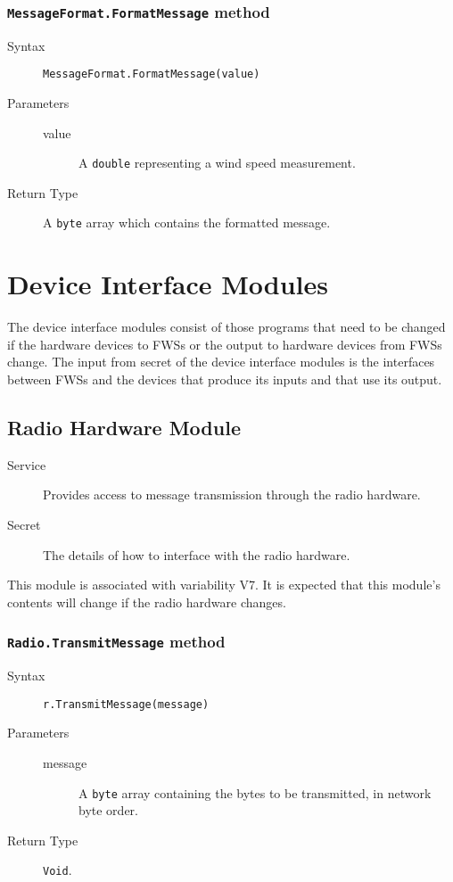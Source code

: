 \documentclass[letterpaper,11pt]{article}
\begin{document}
\subsubsection{\texttt{MessageFormat.FormatMessage} method}
\begin{description}
\item[Syntax] \texttt{MessageFormat.FormatMessage(value)}
\item[Parameters] \hfill
  \begin{description}
  \item[value] A \texttt{double} representing a wind speed measurement.
  \end{description}
\item[Return Type] A \texttt{byte} array which contains the formatted message.
\end{description}


\section{Device Interface Modules}
The device interface modules consist of those programs that need to be changed if the hardware devices to FWSs or the output to hardware devices from FWSs change. The input from secret of the device interface modules is the interfaces between FWSs and the devices that produce its inputs and that use its output.

\subsection{Radio Hardware Module}
\begin{description}
\item[Service] Provides access to message transmission through the radio hardware.
\item[Secret] The details of how to interface with the radio hardware.
\end{description}

This module is associated with variability V7.  It is expected that this module's contents will change if the radio hardware changes.

\subsubsection{\texttt{Radio.TransmitMessage} method}
\begin{description}
\item[Syntax] \texttt{r.TransmitMessage(message)}
\item[Parameters] \hfill
  \begin{description}
  \item[message] A \texttt{byte} array containing the bytes to be transmitted, in network byte order.
  \end{description}
\item[Return Type] \texttt{Void}.
\end{description}
\end{document}
